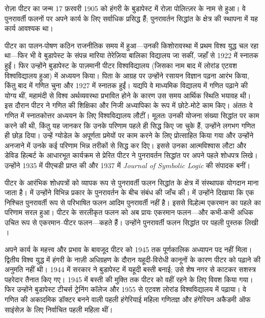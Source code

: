 \documentclass[../../../include/open-logic-section]{subfiles}
\begin{document}


 
रोज़ा पीटर का जन्म 17 फ़रवरी 1905 को हंगरी के बुडापेस्ट में रोज़ा पोलित्ज़र
के नाम से हुआ। वे पुनरावर्ती फलनों पर अपने कार्य के लिए सर्वाधिक प्रसिद्ध
हैं; पुनरावर्तन सिद्धांत के क्षेत्र की स्थापना में यह कार्य आवश्यक था।

पीटर का पालन-पोषण कठिन राजनीतिक समय में हुआ---उनकी किशोरावस्था में प्रथम
विश्व युद्ध चल रहा था---फिर भी वे बुडापेस्ट के संपन्न मारिया तेरेज़िया बालिका
विद्यालय जा सकीं, जहाँ से 1922 में स्नातक हुईं। फिर उन्होंने बुडापेस्ट के
पाज़मानी पीटर विश्वविद्यालय (जिसका नाम बाद में लोरांड एटवश विश्वविद्यालय
हुआ) में अध्ययन किया। पिता के आग्रह पर उन्होंने रसायन विज्ञान पढ़ना आरंभ
किया, किंतु बाद में गणित चुना और 1927 में स्नातक हुईं। यद्यपि वे माध्यमिक
विद्यालय में गणित पढ़ाने की योग्य थीं, महामंदी से विश्व अर्थव्यवस्था
प्रभावित होने के कारण उस समय आर्थिक स्थिति भयावह थी। इस दौरान पीटर ने गणित
की शिक्षिका और निजी अध्यापिका के रूप में छोटे-मोटे काम किए। अंततः वे गणित
में स्नातकोत्तर अध्ययन के लिए विश्वविद्यालय लौटीं। मूलतः उनकी योजना संख्या
सिद्धांत पर काम करने की थी, किंतु यह जानकर कि उनके परिणाम पहले ही सिद्ध किए
जा चुके हैं, उन्होंने लगभग गणित ही छोड़ दिया। उन्हें ग्योडेल के अपूर्णता
प्रमेयों पर काम करने के लिए प्रोत्साहित किया गया और उन्होंने अनजाने में उनके
कई परिणाम भिन्न तरीकों से सिद्ध कर दिए। इससे उनका आत्मविश्वास लौटा और डेविड
हिल्बर्ट के आधारभूत कार्यक्रम से प्रेरित पीटर ने पुनरावर्तन सिद्धांत पर अपने
पहले शोधपत्र लिखे। उन्होंने 1935 में पीएचडी प्राप्त की और 1937 में
\emph{Journal of Symbolic Logic} की संपादक बनीं।

पीटर के आरंभिक शोधपत्रों को व्यापक रूप से पुनरावर्ती फलन सिद्धांत के क्षेत्र
में संस्थापक योगदान माना जाता है। \cite{Peter1935a} में उन्होंने विभिन्न
प्रकार के पुनरावर्तन के बीच संबंध की जाँच की। \cite{Peter1935b} में उन्होंने
दिखाया कि एक निश्चित पुनरावर्ती रूप से परिभाषित फलन आदिम पुनरावर्ती नहीं है।
इससे विल्हेल्म एकरमान का पहले का परिणाम सरल हुआ। पीटर के सरलीकृत फलन को अब
प्रायः एकरमान फलन---और कभी-कभी अधिक उचित रूप से एकरमान--पीटर फलन---कहते हैं।
उन्होंने पुनरावर्ती फलन सिद्धांत पर पहली पुस्तक लिखी \citep{Peter1951}।

अपने कार्य के महत्त्व और प्रभाव के बावजूद पीटर को 1945 तक पूर्णकालिक
अध्यापन पद नहीं मिला। द्वितीय विश्व युद्ध में हंगरी के नाज़ी अधिग्रहण के
दौरान यहूदी-विरोधी कानूनों के कारण पीटर को पढ़ाने की अनुमति नहीं थी। 1944
में सरकार ने बुडापेस्ट में यहूदी बस्ती बनाई; उसे शेष नगर से काटकर सशस्त्र
पहरेदार तैनात किए गए। 1945 में बस्ती की मुक्ति तक पीटर को वहीं रहने के लिए
विवश किया गया। फिर उन्होंने बुडापेस्ट टीचर्स ट्रेनिंग कॉलेज और 1955 से एटवश
लोरांड विश्वविद्यालय में पढ़ाया। वे गणित की अकादमिक डॉक्टर बनने वाली पहली
हंगेरियाई महिला गणितज्ञ और हंगेरियन अकैडमी ऑफ साइंसेज़ के लिए निर्वाचित पहली
महिला थीं।
\end{document}
